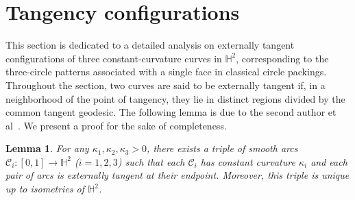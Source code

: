 \documentclass[11pt,leqno]{article}
\numberwithin{equation}{section}
\newtheorem{lemma}[theorem]{Lemma}
\theoremstyle{definition}
\begin{document}
\section{Tangency configurations}
This section is dedicated to a detailed analysis on externally tangent configurations of three constant-curvature curves in $\mathbb{H}^2$, corresponding to the three-circle patterns associated with a single face in classical circle packings.
Throughout the section, two curves are said to be externally tangent if, in a neighborhood of the point of tangency, they lie in distinct regions divided by the common tangent geodesic.
The following lemma is due to the second author et al~\cite{MR4878836}. We present a proof for the sake of completeness.


\begin{lemma}\label{L-2-1}
For any $\kappa_1, \kappa_2, \kappa_3 > 0$, there exists a triple of smooth arcs $\mathcal C_i: [0,1]\to\mathbb{H}^2$ ($i=1,2,3$) such that each $\mathcal C_i$ has constant curvature $\kappa_i$ and each pair of arcs is externally tangent at their endpoint. Moreover, this triple is unique up to isometries of $\mathbb{H}^2$.
\end{lemma}
\end{document}
